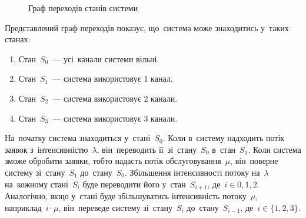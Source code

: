 \documentclass[
  ukrainian,
  simple,
  floatsection,
]{eskdnaukvd}
\newlength{\gridunitwidth}
\begin{document}
      \begin{figure}[!htbp]
        \centering
        \caption{Граф переходів станів системи}
        \label{fig:state-diag}
      \end{figure}

      Представлений граф переходів показує, що~система може знаходитись у~таких станах:
      \begin{enumerate}
        \item Стан~$S_0$~— усі~канали системи вільні.
        \item Стан~$S_1$~— система використовує 1 канал.
        \item Стан~$S_2$~— система використовує 2 канали.
        \item Стан~$S_3$~— система використовує 3 канали.
      \end{enumerate}
      На~початку система знаходиться у~стані~$S_0$. Коли в~систему надходить потік заявок з~інтенсивністю~$\lambda$, він~переводить її~зі~стану~$S_0$ в~стан~$S_1$. Коли система зможе обробити заявки, тобто надасть потік обслуговування~$\mu$, він~поверне систему зі~стану~$S_1$ до~стану~$S_0$. Збільшення інтенсивності потоку на~$\lambda$ на~кожному стані~$S_i$ буде переводити його у~стан~$S_{i+1}$, де~$i \in {0, 1, 2}$. Аналогічно, якщо у~стані буде збільшуватись інтенсивність потоку~$\mu$, наприклад~$i \cdot \mu$, він~переведе систему зі~стану~$S_i$ до~стану~$S_{i-1}$, де~$i \in \{1, 2, 3\}$.
\end{document}
